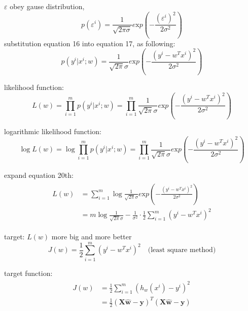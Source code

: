 \documentclass[12pt]{ctexart}%
\begin{document}
	$\varepsilon$ obey gause distribution, \begin{equation}p(\varepsilon^i) = \frac{1}{\surd{2\pi \sigma}}e\text{x}p(-\frac{(\varepsilon^i)^2}{2\sigma^2})\end{equation}
	substitution equation 16 into equation 17, as following:
	\begin{equation}
	p(y^i|x^i; w) = \frac{1}{\surd{2\pi} \sigma}e\text{x}p(-\frac{(y^i - w^T x^i)^2}{2\sigma^2})
	\end{equation}
	
	likelihood function: %
	\begin{equation}
	L(w) = \underset{i=1}{\overset{m}{\mathop{\prod }}} p(y^i|x^i; w) = \underset{i=1}{\overset{m}{\mathop{\prod }}} \frac{1}{\surd{2\pi} \sigma}e\text{x}p(-\frac{(y^i - w^T x^i)^2}{2\sigma^2})
	\end{equation}
	 
	logarithmic likelihood function: %
	\begin{equation}
		\log{L(w)} = \log{\underset{i=1}{\overset{m}{\mathop{\prod }}} p(y^i|x^i; w) = \underset{i=1}{\overset{m}{\mathop{\prod }}} \frac{1}{\surd{2\pi} \sigma}e\text{x}p(-\frac{(y^i - w^T x^i)^2}{2\sigma^2})}
	\end{equation}
	
	expand equation 20th: 
	\begin{align}
	\begin{split}
	L(w) &= \sum_{i=1}^{m} \log \frac{1}{\surd{2\pi} \sigma}e\text{x}p(-\frac{(y^i - w^T x^i)^2}{2\sigma^2}) \\
		 &= m\log \frac{1}{\surd{2\pi} \sigma} - \frac{1}{\sigma^2}\cdot \frac{1}{2}\sum_{i=1}^{m}(y^i - w^T x^i)^2
	\end{split}
	\end{align}
	
	target: $L(w)$ more big and more better
	\begin{equation}
	J(w) = \frac{1}{2}\sum_{i=1}^{m}(y^i - w^T x^i)^2\quad\text{(least square method)}
	\end{equation}
	
	target function:
	\begin{align}
		\begin{split}
	J(w) &= \frac{1}{2}\sum_{i=1}^{m}(h_w(x^i) - y^i)^2\\
		 &= \frac{1}{2}(\boldsymbol{X\hat{w}} - \boldsymbol{y})^T(\boldsymbol{X\hat{w}} - \boldsymbol{y})
		 \end{split}
	\end{align}
	
\end{document}
